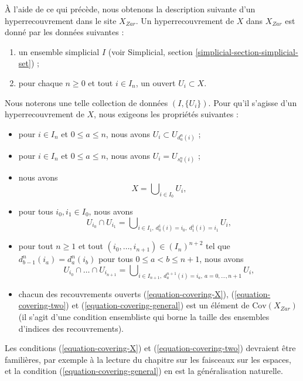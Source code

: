\medskip\noindent
À l'aide de ce qui précède, nous obtenons la description suivante d'un hyperrecouvrement
dans le site $X_{Zar}$. Un hyperrecouvrement de $X$ dans $X_{Zar}$
est donné par les données suivantes :
\begin{enumerate}
\item un ensemble simplicial $I$ (voir
Simplicial, section \ref{simplicial-section-simplicial-set}) ;
\item pour chaque $n \geq 0$ et tout $i \in I_n$, un ouvert $U_i \subset X$.
\end{enumerate}
Nous noterons une telle collection de données $(I, \{U_i\})$.
Pour qu'il s'agisse d'un hyperrecouvrement de $X$, nous exigeons
les propriétés suivantes :
\begin{itemize}
\item pour $i \in I_n$ et $0 \leq a \leq n$,
nous avons $U_i \subset U_{d^n_a(i)}$ ;
\item pour $i \in I_n$ et $0 \leq a \leq n$, nous avons $U_i = U_{s^n_a(i)}$ ;
\item nous avons
\begin{equation}
\label{equation-covering-X}
X = \bigcup\nolimits_{i \in I_0} U_i,
\end{equation}
\item pour tous $i_0, i_1 \in I_0$, nous avons
\begin{equation}
\label{equation-covering-two}
U_{i_0} \cap U_{i_1} =
\bigcup\nolimits_{i \in I_1, \ d^1_0(i) = i_0, \ d^1_1(i) = i_1} U_i,
\end{equation}
\item pour tout $n \geq 1$ et tout
$(i_0, \ldots, i_{n + 1}) \in (I_n)^{n + 2}$ tel que
$d^n_{b - 1}(i_a) = d^n_a(i_b)$ pour tous $0\leq a < b\leq n + 1$,
nous avons
\begin{equation}
\label{equation-covering-general}
U_{i_0} \cap \ldots \cap U_{i_{n + 1}} =
\bigcup\nolimits_{i \in I_{n + 1},
\ d^{n + 1}_a(i) = i_a, \ a = 0, \ldots, n + 1} U_i,
\end{equation}
\item chacun des recouvrements ouverts (\ref{equation-covering-X}),
(\ref{equation-covering-two}) et (\ref{equation-covering-general})
est un élément de $\text{Cov}(X_{Zar})$
(il s'agit d'une condition ensembliste qui borne
la taille des ensembles d'indices des recouvrements).
\end{itemize}
Les conditions (\ref{equation-covering-X}) et
(\ref{equation-covering-two}) devraient être familières, par exemple à la lecture du
chapitre sur les faisceaux sur les espaces, et la condition
(\ref{equation-covering-general}) en est la généralisation naturelle.

